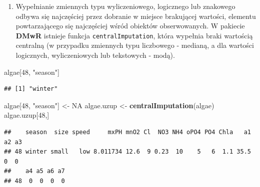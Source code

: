 \documentclass[]{book}
\newenvironment{Shaded}{\begin{snugshade}}{\end{snugshade}}
\newcommand{\DataTypeTok}[1]{\textcolor[rgb]{0.13,0.29,0.53}{#1}}
\newcommand{\DecValTok}[1]{\textcolor[rgb]{0.00,0.00,0.81}{#1}}
\newcommand{\KeywordTok}[1]{\textcolor[rgb]{0.13,0.29,0.53}{\textbf{#1}}}
\newcommand{\NormalTok}[1]{#1}
\newcommand{\OperatorTok}[1]{\textcolor[rgb]{0.81,0.36,0.00}{\textbf{#1}}}
\newcommand{\OtherTok}[1]{\textcolor[rgb]{0.56,0.35,0.01}{#1}}
\newcommand{\StringTok}[1]{\textcolor[rgb]{0.31,0.60,0.02}{#1}}
\providecommand{\tightlist}{%
  \setlength{\itemsep}{0pt}\setlength{\parskip}{0pt}}
\theoremstyle{plain}
\theoremstyle{definition}
\begin{document}
\begin{Shaded}
\end{Shaded}

\begin{enumerate}
\def\labelenumi{\arabic{enumi}.}
\setcounter{enumi}{2}
\tightlist
\item
  Wypełnianie zmiennych typu wyliczeniowego, logicznego lub znakowego odbywa się najczęściej przez dobranie w miejsce brakującej wartości, elementu powtarzającego się najczęściej wśród obiektów obserwowanych. W pakiecie \textbf{DMwR} istnieje funkcja \texttt{centralImputation}, która wypełnia braki wartością centralną (w przypadku zmiennych typu liczbowego - medianą, a dla wartości logicznych, wyliczeniowych lub tekstowych - modą).
\end{enumerate}

\begin{Shaded}
\begin{Highlighting}[]
\NormalTok{algae[}\DecValTok{48}\NormalTok{, }\StringTok{"season"}\NormalTok{]}
\end{Highlighting}
\end{Shaded}

\begin{verbatim}
## [1] "winter"
\end{verbatim}

\begin{Shaded}
\begin{Highlighting}[]
\NormalTok{algae[}\DecValTok{48}\NormalTok{, }\StringTok{"season"}\NormalTok{] <-}\StringTok{ }\OtherTok{NA}
\NormalTok{algae.uzup <-}\StringTok{ }\KeywordTok{centralImputation}\NormalTok{(algae)}
\NormalTok{algae.uzup[}\DecValTok{48}\NormalTok{,]}
\end{Highlighting}
\end{Shaded}

\begin{verbatim}
##    season  size speed     mxPH mnO2 Cl  NO3 NH4 oPO4 PO4 Chla   a1 a2 a3
## 48 winter small   low 8.011734 12.6  9 0.23  10    5   6  1.1 35.5  0  0
##    a4 a5 a6 a7
## 48  0  0  0  0
\end{verbatim}
\end{document}
